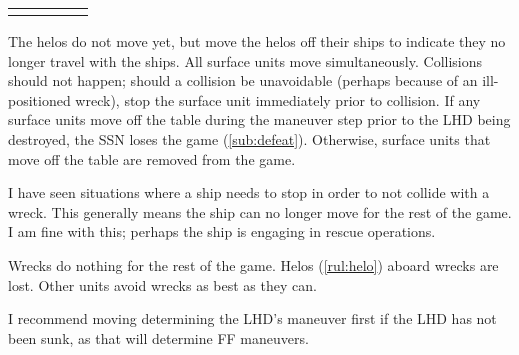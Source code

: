 \documentclass[../TacSubMicroRules.tex]{subfiles}
\begin{document}
\begin{Table}
    \centering
    \begin{tabular}{R{0.25\linewidth}|C{0.2\linewidth}|L{0.35\linewidth}}
        \hline
        \hline
        \hline
        \hline
    \end{tabular}
    \label{tab:speed}
\end{Table}

 
The helos do not move yet, but move the helos off their ships to indicate they no longer travel with the ships.
All surface units move simultaneously.
Collisions should not happen; should a collision be unavoidable (perhaps because of an ill-positioned wreck), stop the surface unit immediately prior to collision.
If any surface units move off the table during the maneuver step prior to the LHD being destroyed, the SSN loses the game (\ref{sub:defeat}).
Otherwise, surface units that move off the table are removed from the game.

\begin{design}
    I have seen situations where a ship needs to stop in order to not collide with a wreck.
    This generally means the ship can no longer move for the rest of the game.
    I am fine with this; perhaps the ship is engaging in rescue operations.
\end{design}

 
Wrecks do nothing for the rest of the game.
Helos (\ref{rul:helo}) aboard wrecks are lost.
Other units avoid wrecks as best as they can.

\begin{design}
    I recommend moving determining the LHD's maneuver first if the LHD has not been sunk,  as that will determine FF maneuvers.
\end{design}
\end{document}
